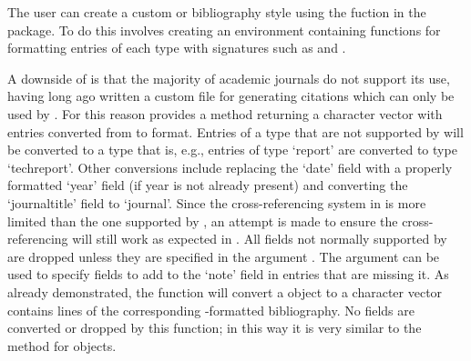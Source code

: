 \documentclass[article]{jss}\usepackage[]{graphicx}\usepackage[]{color}
\newcommand{\ourpkg}{\pkg{RefManageR}}
\begin{document}
The user can create a custom \Biblatex{} or \Bibtex{} bibliography style using the  fuction in the  package.  To do this involves creating an environment containing functions for formatting entries of each type with signatures such as  and .

A downside of \Biblatex{} is that the majority of academic journals do not support its use, having long ago written a custom  file for generating citations which can only be used by \Bibtex{}.  For this reason \ourpkg{} provides a  method returning a character vector with entries converted from \Biblatex{} to \Bibtex{} format.  Entries of a type that are not supported by \Bibtex{} will be converted to a type that is, e.g., entries of type `report' are converted to type `techreport'.  Other conversions include replacing the `date' field with a properly formatted `year' field (if year is not already present) and converting the `journaltitle' field to `journal'.  Since the cross-referencing system in \Bibtex{} is more limited than the one supported by \Biblatex{}, an attempt is made to ensure the cross-referencing will still work as expected in \Bibtex{}.  All fields not normally supported by \Bibtex{} are dropped unless they are specified in the argument .  The argument  can be used to specify fields to add to the `note' field in entries that are missing it.  As already demonstrated, the  function will convert a  object to a character vector contains lines of the corresponding \Biblatex-formatted bibliography.  No fields are converted or dropped by this function; in this way it is very similar to the  method for  objects.
\end{document}
